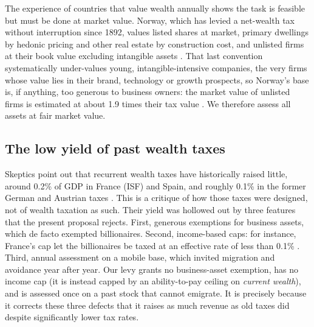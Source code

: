 \documentclass[../../main]{subfiles}
\begin{document}
The experience of countries that value wealth annually shows the task is feasible but must be done at market value. Norway, which has levied a net-wealth tax without interruption since 1892, values listed shares at market, primary dwellings by hedonic pricing and other real estate by construction cost, and unlisted firms at their book value excluding intangible assets \citep{DGTaxud2026}. That last convention systematically under-values young, intangible-intensive companies, the very firms whose value lies in their brand, technology or growth prospects, so Norway's base is, if anything, too generous to business owners: the market value of unlisted firms is estimated at about 1.9 times their tax value \citep{AndresenBo2022, GrindakerVestad2025}. We therefore assess all assets at fair market value. %

\subsection{The low yield of past wealth taxes}

Skeptics point out that recurrent wealth taxes have historically raised little, around 0.2\% of GDP in France (ISF) and Spain, and roughly 0.1\% in the former German and Austrian taxes \citep{DGTaxud2026}. This is a critique of how those taxes were designed, not of wealth taxation as such. Their yield was hollowed out by three features that the present proposal rejects. First, generous exemptions for business assets, which de facto exempted billionaires. %
Second, income-based caps: for instance, France's cap let the billionaires %
be taxed at an effective rate of less than 0.1\% \citep{DGTaxud2026}. %
Third, annual assessment on a mobile base, which invited migration and avoidance year after year. Our levy grants no business-asset exemption, has no income cap (it is instead capped by an ability-to-pay ceiling on \emph{current wealth}), and is assessed once on a past stock that cannot emigrate. It is precisely because it corrects these three defects that it raises as much revenue as old taxes did despite significantly lower tax rates. %
\end{document}
